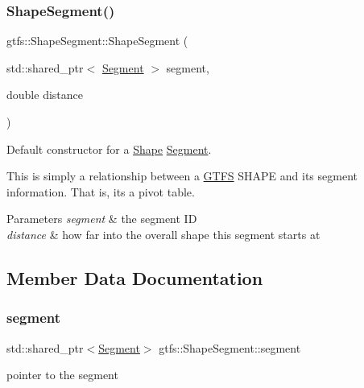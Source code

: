 \subsubsection{\texorpdfstring{Shape\+Segment()}{ShapeSegment()}}
{\footnotesize\ttfamily gtfs\+::\+Shape\+Segment\+::\+Shape\+Segment (\begin{DoxyParamCaption}\item[{std\+::shared\+\_\+ptr$<$ \hyperlink{classgtfs_1_1Segment}{Segment} $>$}]{segment,  }\item[{double}]{distance }\end{DoxyParamCaption})\hspace{0.3cm}{\ttfamily [inline]}}

Default constructor for a \hyperlink{classgtfs_1_1Shape}{Shape} \hyperlink{classgtfs_1_1Segment}{Segment}.

This is simply a relationship between a \hyperlink{classgtfs_1_1GTFS}{G\+T\+FS} S\+H\+A\+PE and it\textquotesingle{}s segment information. That is, it\textquotesingle{}s a \textquotesingle{}pivot table\textquotesingle{}.


\begin{DoxyParams}{Parameters}
{\em segment} & the segment ID \\
\hline
{\em distance} & how far into the overall shape this segment starts at \\
\hline
\end{DoxyParams}


\subsection{Member Data Documentation}
\mbox{\label{structgtfs_1_1ShapeSegment_a3253b76a15e2645f894a75be55006e09}} 
\subsubsection{\texorpdfstring{segment}{segment}}
{\footnotesize\ttfamily std\+::shared\+\_\+ptr$<$\hyperlink{classgtfs_1_1Segment}{Segment}$>$ gtfs\+::\+Shape\+Segment\+::segment}

pointer to the segment \mbox{\label{structgtfs_1_1ShapeSegment_a64afdd03235b9bc256fc18652c6f9c47}} 
